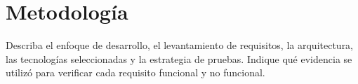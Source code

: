 \section{Metodología}

Describa el enfoque de desarrollo, el levantamiento de requisitos, la
arquitectura, las tecnologías seleccionadas y la estrategia de pruebas. Indique
qué evidencia se utilizó para verificar cada requisito funcional y no
funcional.
